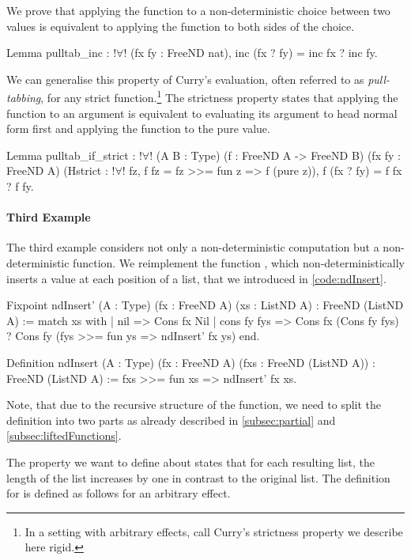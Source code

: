 We prove that applying the function  to a non\--deterministic choice between two values is equivalent to applying the function to both sides of the choice.

\begin{coqcode}
Lemma pulltab_inc : !$\forall$! (fx fy : FreeND nat),
  inc (fx ? fy) = inc fx ? inc fy.
\end{coqcode}

We can generalise this property of Curry's evaluation, often referred to as \emph{pull\--tabbing}, for any strict function.\footnote{In a setting with arbitrary effects, \citet{filinski2007inductive} call Curry's strictness property we describe here rigid.}
The strictness property states that applying the function to an argument is equivalent to evaluating its argument to head normal form first and applying the function to the pure value.

\begin{coqcode}
Lemma pulltab_if_strict : !$\forall$! (A B : Type)
  (f : FreeND A -> FreeND B) (fx fy : FreeND A)
  (Hstrict : !$\forall$! fz, f fz = fz >>= fun z => f (pure z)),
   f (fx ? fy) = f fx ? f fy.
\end{coqcode}

\paragraph{Third Example}
The third example considers not only a non\--deterministic computation but a non\--deterministic function.
We reimplement the function , which non\--deterministically inserts a value at each position of a list, that we introduced in \autoref{code:ndInsert}.

\begin{coqcode}
Fixpoint ndInsert' (A : Type) (fx : FreeND A) (xs : ListND A)
 : FreeND (ListND A) :=
 match xs with
 | nil         => Cons fx Nil
 | cons fy fys => Cons fx (Cons fy fys)
                ? Cons fy (fys >>= fun ys => ndInsert' fx ys)
 end.

Definition ndInsert (A : Type) (fx : FreeND A) (fxs : FreeND (ListND A))
 : FreeND (ListND A) :=
 fxs >>= fun xs => ndInsert' fx xs.
\end{coqcode}

Note, that due to the recursive structure of the function, we need to split the definition into two parts as already described in \autoref{subsec:partial} and \autoref{subsec:liftedFunctions}.

The property we want to define about  states that for each resulting list, the length of the list increases by one in contrast to the original list.
The definition for  is defined as follows for an arbitrary effect.


